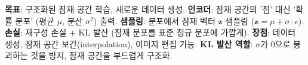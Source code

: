 \documentclass[11pt,a4paper]{article}
\begin{document}
\begin{tcolorbox}[colback=myblue!20, colframe=blue!75!black, title=\textbf{변이형 오토인코더 (VAEs)}]
\textbf{목표}: 구조화된 잠재 공간 학습, 새로운 데이터 생성.
\textbf{인코더}: 잠재 공간의 '점' 대신 '확률 분포' (평균 $\mu$, 분산 $\sigma^2$) 출력.
\textbf{샘플링}: 분포에서 잠재 벡터 $\mathbf{z}$ 샘플링 ($\mathbf{z} = \mu + \sigma \cdot \epsilon$).
\textbf{손실}: 재구성 손실 + KL 발산 (잠재 분포를 표준 정규 분포에 가깝게).
\textbf{장점}: 데이터 생성, 잠재 공간 보간(interpolation), 이미지 편집 가능.
\textbf{KL 발산 역할}: $\sigma$가 0으로 붕괴하는 것을 방지, 잠재 공간을 부드럽게 구조화.
\end{tcolorbox}
\end{document}
